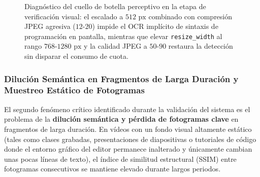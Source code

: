 \begin{figure}[htbp]
\caption{Diagnóstico del cuello de botella perceptivo en la etapa de verificación visual: el escalado a $512\text{ px}$ combinado con compresión JPEG agresiva ($12\text{-}20$) impide el OCR implícito de sintaxis de programación en pantalla, mientras que elevar \texttt{resize\_width} al rango $768\text{-}1280\text{ px}$ y la calidad JPEG a $50\text{-}90$ restaura la detección sin disparar el consumo de cuota.} %
\label{fig:cuello_botella_ocr_implicito}
\end{figure}

\subsubsection{Dilución Semántica en Fragmentos de Larga Duración y Muestreo Estático de Fotogramas}
\label{subsubsec:dilucion_semantica_muestreo}

El segundo fenómeno crítico identificado durante la validación del sistema es el problema de la \textbf{dilución semántica y pérdida de fotogramas clave} en fragmentos de larga duración. %
En vídeos con un fondo visual altamente estático (tales como clases grabadas, presentaciones de diapositivas o tutoriales de código donde el entorno gráfico del editor permanece inalterado y únicamente cambian unas pocas líneas de texto), el índice de similitud estructural (SSIM) entre fotogramas consecutivos se mantiene elevado durante largos periodos. %

